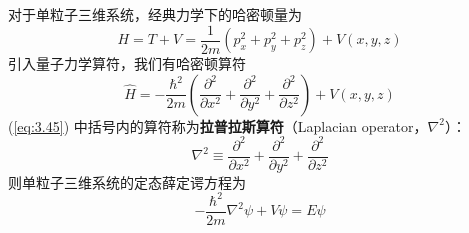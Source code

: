 	对于单粒子三维系统，经典力学下的哈密顿量为
	\begin{equation}
		H = T + V = \frac{1}{2m}\left(p_x^2+p_y^2+p_z^2\right)+V\left(x,y,z\right)
		\label{eq:3.44}
	\end{equation}
	引入量子力学算符，我们有哈密顿算符
	\begin{equation}
		\hat{H} = -\frac{\hbar^2}{2m}\left(\frac{\partial^2}{\partial x^2}+\frac{\partial^2}{\partial y^2}+\frac{\partial^2}{\partial z^2}\right)+V\left(x,y,z\right)
		\label{eq:3.45}
	\end{equation}
	(\ref{eq:3.45}) 中括号内的算符称为\textbf{拉普拉斯算符}（Laplacian operator，$\nabla^2$）：
	\begin{equation}
		\boxed{
			\nabla^2 \equiv \frac{\partial^2}{\partial x^2} + \frac{\partial^2}{\partial y^2} + \frac{\partial^2}{\partial z^2}
		}
		\label{eq:3.46}
	\end{equation}
	则单粒子三维系统的定态薛定谔方程为
	\begin{equation}
		-\frac{\hbar^2}{2m}\nabla^2\psi + V\psi = E\psi
		\label{eq:3.47}
	\end{equation}

